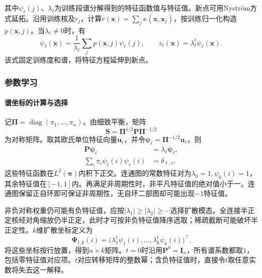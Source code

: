其中$\psi_\ell(j)$、$\lambda_\ell$为训练段谱分解得到的特征函数值与特征值。新点可用Nystr\"om方式延拓。沿用训练核及$r_j$，计算$r(\bm{x})=\sum_j\kappa(\bm{x},\bm{x}_j)$，按训练归一化构造$p(\bm{x},j)$。当$\lambda_\ell\ne0$时，有
\begin{equation}
  \label{eq:dim-diffusion-extension}
  \psi_\ell(\bm{x})
  =\frac1{\lambda_\ell}\sum_jp(\bm{x},j)\psi_\ell(j),
  \qquad
  z_\ell(\bm{x})=\lambda_\ell^t\psi_\ell(\bm{x}).
\end{equation}
该式固定训练度和谱，将特征方程延伸到新点。

\subsubsection{参数学习}

\paragraph{谱坐标的计算与选择}

记$\bm{\Pi}=\operatorname{diag}(\pi_1,\ldots,\pi_n)$。由细致平衡，矩阵
\[
  \bm{S}=\bm{\Pi}^{1/2}\bm{P}\bm{\Pi}^{-1/2}
\]
为对称矩阵。取其欧氏单位特征向量$\bm{u}_\ell$，并令$\bm{\psi}_\ell=\bm{\Pi}^{-1/2}\bm{u}_\ell$，则
\begin{equation}
  \label{eq:dim-diffusion-eigenvectors}
  \begin{aligned}
    \bm{P}\bm{\psi}_\ell&=\lambda_\ell\bm{\psi}_\ell,\\
    \sum_i\pi_i\psi_\ell(i)\psi_r(i)&=\delta_{\ell,r}.
  \end{aligned}
\end{equation}
这些特征函数在$L^2(\bm{\pi})$内积下正交。连通图的常数特征对为$\lambda_0=1,\psi_0(i)=1$，其余特征值在$[-1,1]$内。再满足非周期性时，非平凡特征值的绝对值小于一。连通图保留正自环即可保证非周期性，无自环二部图却可能出现$-1$特征值。

非负对称权重仍可能有负特征值，应按$|\lambda_1|\geq|\lambda_2|\geq\cdots$选择扩散模态。全连接半正定核经对角缩放仍半正定，此时才可按非负特征值降序选取；稀疏截断可能破坏半正定性。$k$维扩散坐标定义为
\begin{equation}
  \label{eq:dim-diffusion-map}
  \bm{\Psi}_{t,k}(i)
  =\bigl(\lambda_1^t\psi_1(i),\ldots,
         \lambda_k^t\psi_k(i)\bigr)^{\top}.
\end{equation}
将这些坐标按行放置，得到$n\times k$矩阵。$t=0$时沿用$\bm P^0=\bm I_n$，所有谱系数都取$1$，包括零特征值对应项。$t$对应转移矩阵的整数幂；含负特征值时，直接令$t$取任意实数将失去这一解释。

